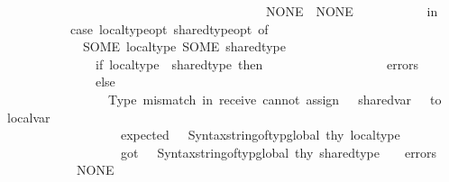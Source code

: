 \begin{isabellebody}
\ \ \ \ \ \ \ \ \ \ \ \ \ \ \ \ \ \ \ \ \ \ \ \ \ \ \ \ \ \ \ \ \ \ \ \ \ \ \ \ \ \ {\isacharbar}{\kern0pt}\ NONE\ {\isacharequal}{\kern0pt}{\isachargreater}{\kern0pt}\ NONE\isanewline
\isanewline
\ \ \ \ \ \ \ \ \ \ \ in\isanewline
\ \ \ \ \ \ \ \ \ \ \ \ case\ {\isacharparenleft}{\kern0pt}local{\isacharunderscore}{\kern0pt}type{\isacharunderscore}{\kern0pt}opt{\isacharcomma}{\kern0pt}\ shared{\isacharunderscore}{\kern0pt}type{\isacharunderscore}{\kern0pt}opt{\isacharparenright}{\kern0pt}\ of\isanewline
\ \ \ \ \ \ \ \ \ \ \ \ \ \ {\isacharparenleft}{\kern0pt}SOME\ local{\isacharunderscore}{\kern0pt}type{\isacharcomma}{\kern0pt}\ SOME\ shared{\isacharunderscore}{\kern0pt}type{\isacharparenright}{\kern0pt}\ {\isacharequal}{\kern0pt}{\isachargreater}{\kern0pt}\isanewline
\ \ \ \ \ \ \ \ \ \ \ \ \ \ \ \ if\ local{\isacharunderscore}{\kern0pt}type\ {\isacharequal}{\kern0pt}\ shared{\isacharunderscore}{\kern0pt}type\ then\ \isanewline
\ \ \ \ \ \ \ \ \ \ \ \ \ \ \ \ \ \ errors\isanewline
\ \ \ \ \ \ \ \ \ \ \ \ \ \ \ \ else\isanewline
\ \ \ \ \ \ \ \ \ \ \ \ \ \ \ \ \ \ {\isacharparenleft}{\kern0pt}{\isachardoublequote}{\kern0pt}Type\ mismatch\ in\ receive{\isacharcolon}{\kern0pt}\ cannot\ assign\ {\isachardoublequote}{\kern0pt}\ {\isacharcircum}{\kern0pt}\ shared{\isacharunderscore}{\kern0pt}var\ {\isacharcircum}{\kern0pt}\ {\isachardoublequote}{\kern0pt}\ to\ {\isachardoublequote}{\kern0pt}\ {\isacharcircum}{\kern0pt}\ local{\isacharunderscore}{\kern0pt}var\ {\isacharcircum}{\kern0pt}\isanewline
\ \ \ \ \ \ \ \ \ \ \ \ \ \ \ \ \ \ \ {\isachardoublequote}{\kern0pt}\ {\isacharparenleft}{\kern0pt}expected\ {\isachardoublequote}{\kern0pt}\ {\isacharcircum}{\kern0pt}\ Syntax{\isachardot}{\kern0pt}string{\isacharunderscore}{\kern0pt}of{\isacharunderscore}{\kern0pt}typ{\isacharunderscore}{\kern0pt}global\ thy\ local{\isacharunderscore}{\kern0pt}type\ {\isacharcircum}{\kern0pt}\isanewline
\ \ \ \ \ \ \ \ \ \ \ \ \ \ \ \ \ \ \ {\isachardoublequote}{\kern0pt}{\isacharcomma}{\kern0pt}\ got\ {\isachardoublequote}{\kern0pt}\ {\isacharcircum}{\kern0pt}\ Syntax{\isachardot}{\kern0pt}string{\isacharunderscore}{\kern0pt}of{\isacharunderscore}{\kern0pt}typ{\isacharunderscore}{\kern0pt}global\ thy\ shared{\isacharunderscore}{\kern0pt}type\ {\isacharcircum}{\kern0pt}\ {\isachardoublequote}{\kern0pt}{\isacharparenright}{\kern0pt}{\isachardoublequote}{\kern0pt}{\isacharparenright}{\kern0pt}\ {\isacharcolon}{\kern0pt}{\isacharcolon}{\kern0pt}\ errors\isanewline
\ \ \ \ \ \ \ \ \ \ \ \ {\isacharbar}{\kern0pt}\ {\isacharparenleft}{\kern0pt}NONE{\isacharcomma}{\kern0pt}\ {\isacharunderscore}{\kern0pt}{\isacharparenright}{\kern0pt}\ {\isacharequal}{\kern0pt}{\isachargreater}{\kern0pt}\isanewline

\end{isabellebody}
